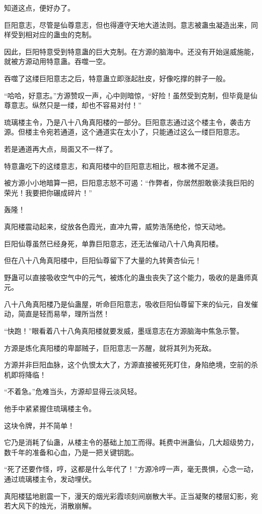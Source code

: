 \begin{this_body}
知道这点，便好办了。

巨阳意志，尽管是仙尊意志，但也得遵守天地大道法则。意志被蛊虫凝造出来，同样受到相对应的蛊虫的克制。

因此，巨阳特意受到特意蛊的巨大克制。在方源的脑海中。还没有开始逞威施能，就被方源动用特意蛊。吞噬一空。

吞噬了这缕巨阳意志之后，特意蛊立即涨起肚皮，好像吃撑的胖子一般。

“哈哈，好意志。”方源赞叹一声，心中则暗惊，“好险！虽然受到克制，但毕竟是仙尊意志。纵然只是一缕，却也不容易对付！”

琉璃楼主令，乃是八十八角真阳楼的一部分。巨阳意志通过这个楼主令，袭击方源。但楼主令宛若通道，这个通道实在太小了，只能通过这么一缕巨阳意志。

若是通道再大点，局面又不一样了。

特意蛊吃下的这缕意志，和真阳楼中的巨阳意志相比，根本微不足道。

被方源小小地暗算一把，巨阳意志怒不可遏：“作弊者，你居然胆敢亵渎我巨阳的荣光！我要把你碾成碎片！”

轰隆！

真阳楼震动起来，绽放各色霞光，直冲九霄，威势浩荡绝伦，惊天动地。

巨阳仙尊虽然已经身死，单靠巨阳意志，还无法催动八十八角真阳楼。

但在八十八角真阳楼中，巨阳仙尊留下了大量的九转黄杏仙元！

野蛊可以直接吸收空气中的元气，被炼化的蛊虫丧失了这个能力，吸收的是蛊师真元。

八十八角真阳楼乃是仙蛊屋，听命巨阳意志，吸收巨阳仙尊留下来的仙元，自发催动，简直是轻而易举，理所当然！

“快跑！”眼看着八十八角真阳楼就要发威，墨瑶意志在方源脑海中焦急示警。

方源是炼化真阳楼的卑鄙贼子，巨阳意志一苏醒，就将其列为死敌。

方源并非巨阳血脉，这个仇恨太大了，方源直接被死死盯住，身陷绝境，空前的杀机即将降临！

“不着急。”危难当头，方源却显得云淡风轻。

他手中紧紧握住琉璃楼主令。

这块令牌，并不简单！

它乃是消耗了仙蛊，从楼主令的基础上加工而得。耗费中洲蛊仙，几大超级势力，数千年的准备和心血，乃是一把关键钥匙。

“死了还要作怪，哼，这都是什么年代了！”方源冷哼一声，毫无畏惧，心念一动，通过琉璃楼主令，发动埋伏。

真阳楼猛地剧震一下，漫天的烟光彩霞顷刻间崩散大半。正当凝聚的楼层幻影，宛若大风下的烛光，消散崩解。


\end{this_body}
